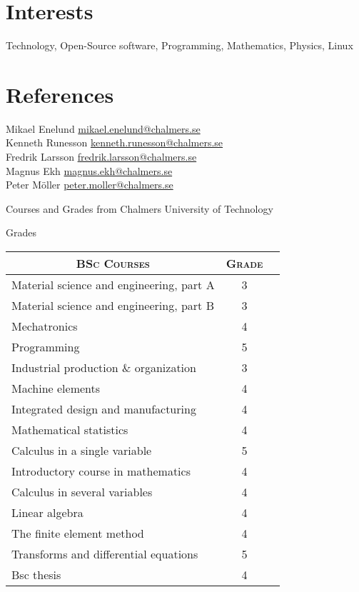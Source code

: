 \documentclass[a4paper,10pt]{article} %
\begin{document}
{\section{Interests}

Technology, Open-Source software, Programming, Mathematics, Physics, Linux


\section{References}
Mikael Enelund \href{mailto:mikael.enelund@chalmers.se}{mikael.enelund@chalmers.se}\\
Kenneth Runesson \href{mailto:kenneth.runesson@chalmers.se}{kenneth.runesson@chalmers.se}\\
Fredrik Larsson \href{mailto:fredrik.larsson@chalmers.se}{fredrik.larsson@chalmers.se}\\
Magnus Ekh \href{mailto:magnus.ekh@chalmers.se}{magnus.ekh@chalmers.se}\\
Peter Möller \href{mailto:peter.moller@chalmers.se}{peter.moller@chalmers.se}

\newpage
\par{
\centering\Large
\hypertarget{grds}{Courses and Grades from Chalmers University of Technology}\par}
\large{\centering Grades\par}\normalsize

\begin{center}
\begin{tabular}{lcc}

\multicolumn{1}{c}{\textsc{BSc Courses}} & \textsc{Grade}\\
\hline
Material science and engineering, part A  & 3\\
Material science and engineering, part B & 3\\
Mechatronics & 4\\
Programming & 5\\
Industrial production \& organization & 3\\
Machine elements & 4\\
Integrated design and manufacturing & 4\\
Mathematical statistics & 4\\
Calculus in a single variable & 5\\
Introductory course in mathematics & 4\\
Calculus in several variables & 4\\
Linear algebra & 4\\
The finite element method & 4\\
Transforms and differential equations & 5\\
Bsc thesis & 4\\


\end{tabular}
\end{center}}
\end{document}
